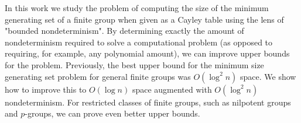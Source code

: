 In this work we study the problem of computing the size of the minimum generating set of a finite group when given as a Cayley table using the lens of "bounded nondeterminism".
By determining exactly the amount of nondeterminism required to solve a computational problem (as opposed to requiring, for example, any polynomial amount), we can improve upper bounds for the problem.
Previously, the best upper bound for the minimum size generating set problem for general finite groups was $O(\log^2 n)$ space.
We show how to improve this to $O(\log n)$ space augmented with $O(\log^2 n)$ nondeterminism.
 For restricted classes of finite groups, such as nilpotent groups and $p$-groups, we can prove even better upper bounds.
